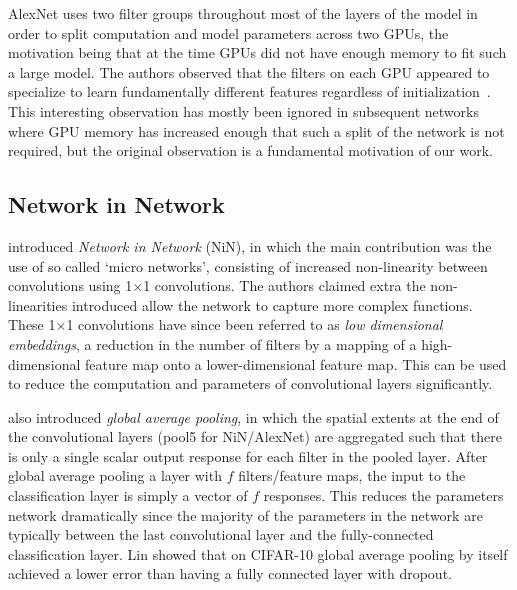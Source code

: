 \documentclass[thesis]{subfiles}
\begin{document}
AlexNet uses two filter groups throughout most of the layers of the model in order to split computation and model parameters across two GPUs, the motivation being that at the time GPUs did not have enough memory to fit such a large model. The authors observed that the filters on each GPU appeared to specialize to learn fundamentally different features regardless of initialization~\citep{Krizhevsky2012}. This interesting observation has mostly been ignored in subsequent networks where GPU memory has increased enough that such a split of the network is not required, but the original observation is a fundamental motivation of our work.

\subsection{Network in Network}
\citet{Lin2013NiN} introduced \emph{Network in Network} (NiN), in which the main contribution was the use of so called `micro networks', consisting of increased non-linearity between convolutions using 1$\times$1 convolutions. The authors claimed extra the non-linearities introduced allow the network to capture more complex functions. These 1$\times $1 convolutions have since been referred to as \emph{low dimensional embeddings}, \ie a reduction in the number of filters by a mapping of a high-dimensional feature map onto a lower-dimensional feature map. This can be used to reduce the computation and parameters of convolutional layers significantly. 

\citet{Lin2013NiN} also introduced \emph{global average pooling}, in which the spatial extents at the end of the convolutional layers (\ie pool5 for NiN/AlexNet) are aggregated such that there is only a single scalar output response for each filter in the pooled layer. After global average pooling a layer with $f$ filters/feature maps, the input to the classification layer is simply a vector of $f$ responses. This reduces the parameters network dramatically since the majority of the parameters in the network are typically between the last convolutional layer and the fully-connected classification layer. Lin \etal showed that on CIFAR-10 global average pooling by itself achieved a lower error than having a fully connected layer with dropout.
\end{document}
